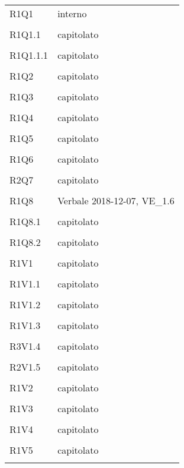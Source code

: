 \begin{longtable}{ >{\centering}p{}
		>{\centering}p{}}
	R1Q1 & interno\\\tabularnewline
	
	R1Q1.1 & capitolato\\\tabularnewline
	
	R1Q1.1.1 & capitolato\\\tabularnewline
	
	R1Q2 & capitolato\\\tabularnewline
	
	R1Q3 & capitolato\\\tabularnewline
	
	R1Q4 & capitolato\\\tabularnewline
	
	R1Q5 & capitolato\\\tabularnewline
	
	R1Q6 & capitolato\\\tabularnewline
	
	R2Q7 & capitolato\\\tabularnewline
	
	R1Q8 & Verbale 2018-12-07, VE\_1.6\\\tabularnewline
	
	R1Q8.1 & capitolato\\\tabularnewline
	
	R1Q8.2 & capitolato\\\tabularnewline
	
	R1V1 & capitolato\\\tabularnewline
	
	R1V1.1 & capitolato\\\tabularnewline
	
	R1V1.2 & capitolato\\\tabularnewline
	
	R1V1.3 & capitolato\\\tabularnewline
	
	R3V1.4 & capitolato\\\tabularnewline
	
	R2V1.5 & capitolato\\\tabularnewline
	
	R1V2 & capitolato\\\tabularnewline
	
	R1V3 & capitolato\\\tabularnewline
	
	R1V4 & capitolato\\\tabularnewline
	
	R1V5 & capitolato\\\tabularnewline
	

\end{longtable}
